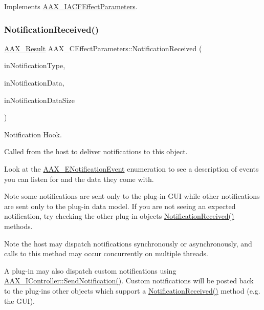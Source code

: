 Implements \mbox{\hyperlink{a01669_a711969adc95624fb9ac8a3e3b2c23696}{A\+A\+X\+\_\+\+I\+A\+C\+F\+Effect\+Parameters}}.

\mbox{\label{a01481_af18b23ec6d4e60e60e27c209c17e573a}} 
\subsubsection{\texorpdfstring{NotificationReceived()}{NotificationReceived()}}
{\footnotesize\ttfamily \mbox{\hyperlink{a00392_a4d8f69a697df7f70c3a8e9b8ee130d2f}{A\+A\+X\+\_\+\+Result}} A\+A\+X\+\_\+\+C\+Effect\+Parameters\+::\+Notification\+Received (\begin{DoxyParamCaption}\item[{\mbox{\hyperlink{a00392_ac678f9c1fbcc26315d209f71a147a175}{A\+A\+X\+\_\+\+C\+Type\+ID}}}]{in\+Notification\+Type,  }\item[{const void $\ast$}]{in\+Notification\+Data,  }\item[{uint32\+\_\+t}]{in\+Notification\+Data\+Size }\end{DoxyParamCaption})\hspace{0.3cm}{\ttfamily [virtual]}}



Notification Hook. 

Called from the host to deliver notifications to this object.

Look at the \mbox{\hyperlink{a00491_afab5ea2cfd731fc8f163b6caa685406e}{A\+A\+X\+\_\+\+E\+Notification\+Event}} enumeration to see a description of events you can listen for and the data they come with.


\begin{DoxyItemize}
\item \begin{DoxyNote}{Note}
some notifications are sent only to the plug-\/in G\+UI while other notifications are sent only to the plug-\/in data model. If you are not seeing an expected notification, try checking the other plug-\/in objects\textquotesingle{} {\ttfamily \mbox{\hyperlink{a01481_af18b23ec6d4e60e60e27c209c17e573a}{Notification\+Received()}}} methods.
\end{DoxyNote}

\item \begin{DoxyNote}{Note}
the host may dispatch notifications synchronously or asynchronously, and calls to this method may occur concurrently on multiple threads.
\end{DoxyNote}
A plug-\/in may also dispatch custom notifications using \mbox{\hyperlink{a01789_a0384f820cecf8cf7671057060bf5ba4f}{A\+A\+X\+\_\+\+I\+Controller\+::\+Send\+Notification()}}. Custom notifications will be posted back to the plug-\/in\textquotesingle{}s other objects which support a {\ttfamily \mbox{\hyperlink{a01481_af18b23ec6d4e60e60e27c209c17e573a}{Notification\+Received()}}} method (e.\+g. the G\+UI).
\end{DoxyItemize}


